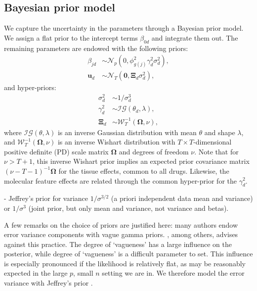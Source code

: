 \documentclass[a4paper,hidelinks]{article}\usepackage[]{graphicx}\usepackage[]{color}
\newcommand{\0}{\bm{0}}
\renewcommand{\(}{\left(}
\renewcommand{\)}{\right)}
\renewcommand{\[}{\left[}
\renewcommand{\]}{\right]}
\begin{document}
	\subsection{Bayesian prior model}
	We capture the uncertainty in the parameters through a Bayesian prior model. We assign a flat prior to the intercept terms $\beta_{0d}$ and integrate them out. The remaining parameters are endowed with the following priors:
	\begin{subequations}\label{eq:prior}
		\begin{align}
		\beta_{jd} & \sim \mathcal{N}_p (0, \phi^2_{g(j)} \gamma_d^2 \sigma_d^2), \\
		\mathbf{u}_{d} & \sim \mathcal{N}_T (\mathbf{0}, \bm{\Xi}_d \sigma_d^2),
		\end{align}
	\end{subequations}
	and hyper-priors:
	\begin{subequations}\label{eq:hyperprior}
		\begin{align}
			\sigma_d^{2} & \sim 1/\sigma_d^{3} \\
			\gamma_d^{2} & \sim \mathcal{IG}(\theta_d, \lambda), \\
			\bm{\Xi}_d & \sim \mathcal{W}^{-1}_T(\bm{\Omega}, \nu),
		\end{align}
	\end{subequations}
	where $\mathcal{IG}(\theta, \lambda)$ is an inverse Gaussian distribution with mean $\theta$ and shape $\lambda$, and $\mathcal{W}^{-1}_T(\bm{\Omega}, \nu)$ is an inverse Wishart distribution with $T \times T$-dimensional positive definite (PD) scale matrix $\bm{\Omega}$ and degrees of freedom $\nu$. Note that for $\nu > T + 1$, this inverse Wishart prior implies an expected prior covariance matrix $(\nu - T - 1)^{-1} \bm{\Omega}$ for the tissue effects, common to all drugs. Likewise, the molecular feature effects are related through the common hyper-prior for the $\gamma_d^2$.
	
	- Jeffrey's prior for variance $1/\sigma^{3/2}$ (a priori independent data mean and variance) or $1/\sigma^3$ (joint prior, but only mean and variance, not variance and betas).

	A few remarks on the choice of priors are justified here: many authors endow error variance components with vague gamma priors. \cite{gelman_prior_2006}, among others, advises against this practice. The degree of `vagueness' has a large influence on the posterior, while degree of `vagueness' is a difficult parameter to set. This influence is especially pronounced if the likelihood is relatively flat, as may be reasonably expected in the large $p$, small $n$ setting we are in. We therefore model the error variance with Jeffrey's prior \cite[]{jeffreys_invariant_1946}. 
	
\end{document}
